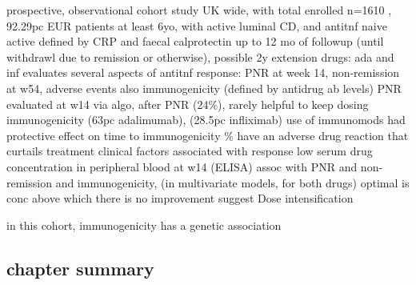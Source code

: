 \begin{outline}
\1 prospective, observational cohort study UK wide, with total enrolled n=1610 , 92.29pc EUR \autocite{kennedy2019PredictorsAntiTNFTreatment}
    \2 patients at least 6yo, with active luminal CD, and antitnf naive
        \3 active defined by CRP and faecal calprotectin
    \2 up to 12 mo of followup (until withdrawl due to remission or otherwise), possible 2y extension
     drugs: ada and inf
    \2 evaluates several aspects of antitnf response: PNR at week 14, non-remission at w54, adverse events
        \3 also immunogenicity (defined by antidrug ab levels)
    \2 PNR evaluated at w14 via algo, after PNR (24\%), rarely helpful to keep dosing
    \2 immunogenicity (63pc adalimumab), (28.5pc infliximab)
        \3 use of immunomods had protective effect on time to immunogenicity 
    \% have an adverse drug reaction that curtails treatment
    \2 clinical factors associated with response
        \3 low serum drug concentration in peripheral blood at w14 (ELISA) assoc with PNR and non-remission and immunogenicity, (in multivariate models, for both drugs) 
        \3 optimal is conc above which there is no improvement
    \2 suggest Dose intensification

\1 in this cohort, immunogenicity has a genetic association \autocite{sazonovs2019HLADQA105Carriage} 

\subsection{chapter summary}


\end{outline}
